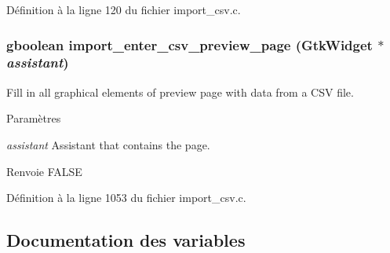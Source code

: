 Définition à la ligne 120 du fichier import\_\-csv.c.

\subsubsection[{import\_\-enter\_\-csv\_\-preview\_\-page}]{\setlength{\rightskip}{0pt plus 5cm}gboolean import\_\-enter\_\-csv\_\-preview\_\-page (GtkWidget $\ast$ {\em assistant})}\label{import__csv_8c_afa61668796ba48ba9a3df231034349ca}
Fill in all graphical elements of preview page with data from a CSV file.


\begin{DoxyParams}{Paramètres}
\item[{\em assistant}]Assistant that contains the page.\end{DoxyParams}
\begin{DoxyReturn}{Renvoie}
FALSE 
\end{DoxyReturn}


Définition à la ligne 1053 du fichier import\_\-csv.c.



\subsection{Documentation des variables}
